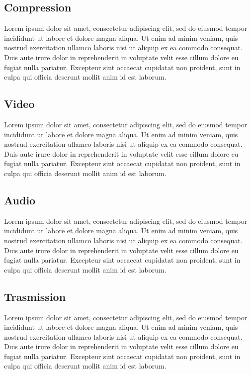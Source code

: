 \subsection{Compression}
Lorem ipsum dolor sit amet, consectetur adipiscing elit, sed do eiusmod tempor incididunt ut labore et dolore magna aliqua. Ut enim ad minim veniam, quis nostrud exercitation ullamco laboris nisi ut aliquip ex ea commodo consequat. Duis aute irure dolor in reprehenderit in voluptate velit esse cillum dolore eu fugiat nulla pariatur. Excepteur sint occaecat cupidatat non proident, sunt in culpa qui officia deserunt mollit anim id est laborum.

\subsection{Video}
Lorem ipsum dolor sit amet, consectetur adipiscing elit, sed do eiusmod tempor incididunt ut labore et dolore magna aliqua. Ut enim ad minim veniam, quis nostrud exercitation ullamco laboris nisi ut aliquip ex ea commodo consequat. Duis aute irure dolor in reprehenderit in voluptate velit esse cillum dolore eu fugiat nulla pariatur. Excepteur sint occaecat cupidatat non proident, sunt in culpa qui officia deserunt mollit anim id est laborum.

\subsection{Audio}
Lorem ipsum dolor sit amet, consectetur adipiscing elit, sed do eiusmod tempor incididunt ut labore et dolore magna aliqua. Ut enim ad minim veniam, quis nostrud exercitation ullamco laboris nisi ut aliquip ex ea commodo consequat. Duis aute irure dolor in reprehenderit in voluptate velit esse cillum dolore eu fugiat nulla pariatur. Excepteur sint occaecat cupidatat non proident, sunt in culpa qui officia deserunt mollit anim id est laborum.

\subsection{Trasmission}
Lorem ipsum dolor sit amet, consectetur adipiscing elit, sed do eiusmod tempor incididunt ut labore et dolore magna aliqua. Ut enim ad minim veniam, quis nostrud exercitation ullamco laboris nisi ut aliquip ex ea commodo consequat. Duis aute irure dolor in reprehenderit in voluptate velit esse cillum dolore eu fugiat nulla pariatur. Excepteur sint occaecat cupidatat non proident, sunt in culpa qui officia deserunt mollit anim id est laborum.



